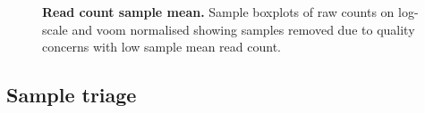 \begin{figure}[!ht]
         \begin{center}
%
%
    \end{center}
  \caption[Read count sample mean]{\textbf{Read count sample mean.} Sample boxplots of raw counts on log-scale and voom normalised showing samples removed due to quality concerns with low sample mean read count.}
\label{fig:boxplot}
\end{figure}


\subsection{Sample triage}

